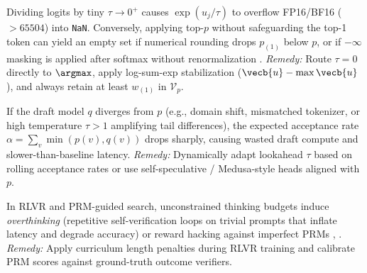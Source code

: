 \documentclass[../../../../master.tex]{subfiles}
\begin{document}
\begin{pitfall}
Dividing logits by tiny $\tau \to 0^+$ causes $\exp(u_j / \tau)$ to overflow FP16/BF16 ($> 65504$) into \texttt{NaN}. Conversely, applying top-$p$ without safeguarding the top-1 token can yield an empty set if numerical rounding drops $p_{(1)}$ below $p$, or if $-\infty$ masking is applied after softmax without renormalization . \emph{Remedy:} Route $\tau = 0$ directly to $\argmax$, apply log-sum-exp stabilization ($\vecb{u} - \max \vecb{u}$), and always retain at least $w_{(1)}$ in $\mathcal{V}_p$.
\end{pitfall}

\begin{pitfall}
If the draft model $q$ diverges from $p$ (e.g., domain shift, mismatched tokenizer, or high temperature $\tau > 1$ amplifying tail differences), the expected acceptance rate $\alpha = \sum_v \min(p(v), q(v))$ drops sharply, causing wasted draft compute and slower-than-baseline latency. \emph{Remedy:} Dynamically adapt lookahead $\tau$ based on rolling acceptance rates or use self-speculative / Medusa-style heads aligned with $p$.
\end{pitfall}

\begin{pitfall}
In RLVR and PRM-guided search, unconstrained thinking budgets induce \emph{overthinking} (repetitive self-verification loops on trivial prompts that inflate latency and degrade accuracy) or reward hacking against imperfect PRMs , . \emph{Remedy:} Apply curriculum length penalties during RLVR training and calibrate PRM scores against ground-truth outcome verifiers.
\end{pitfall}
\end{document}
